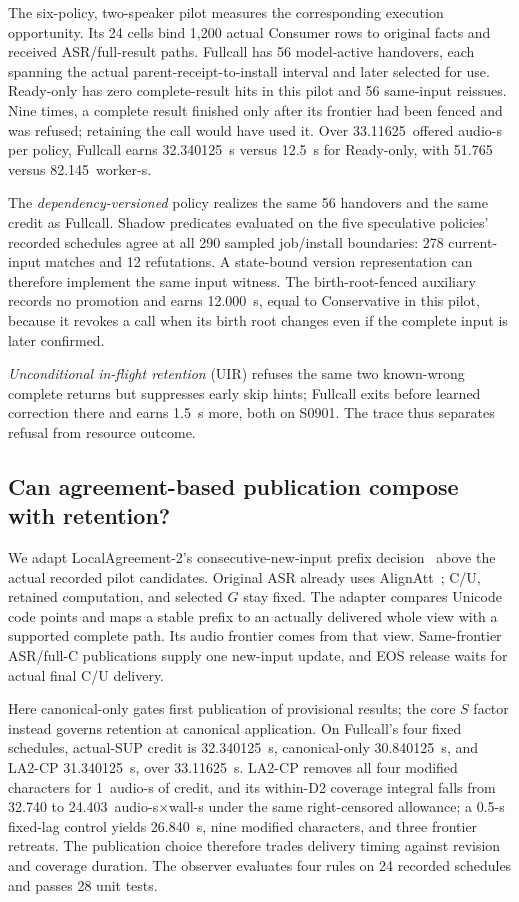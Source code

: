 The six-policy, two-speaker pilot measures the corresponding execution
opportunity. Its 24 cells bind 1,200 actual Consumer rows to original
facts and received ASR/full-result paths. Fullcall has 56 model-active
handovers, each spanning the actual parent-receipt-to-install interval
and later selected for use. Ready-only has zero complete-result hits in
this pilot and 56 same-input reissues. Nine times, a complete result
finished only after its frontier had been fenced and was refused;
retaining the call would have used it.
Over 33.11625~offered audio-s per policy, Fullcall earns 32.340125~s
versus 12.5~s for Ready-only, with 51.765 versus 82.145~worker-s.

The \emph{dependency-versioned} policy realizes the same 56 handovers
and the same credit as Fullcall. Shadow predicates evaluated on the
five speculative policies' recorded schedules agree at all 290 sampled
job/install boundaries: 278 current-input matches and 12 refutations.
A state-bound version representation can therefore implement the same
input witness. The birth-root-fenced auxiliary
records no promotion and earns 12.000~s, equal to Conservative in this
pilot, because it revokes a call when its birth root changes even if the
complete input is later confirmed.

\emph{Unconditional in-flight retention} (UIR) refuses the same two
known-wrong complete returns but suppresses early skip hints; Fullcall
exits before learned correction there and earns 1.5~s more, both on
S0901. The trace thus separates refusal from resource outcome.

\subsection{Can agreement-based publication compose with retention?}
We adapt LocalAgreement-2's consecutive-new-input prefix
decision~\cite{machacek2023whisperstreaming} above the actual recorded
pilot candidates. Original ASR already uses AlignAtt~\cite{papi2023alignatt};
C/U, retained computation, and selected $G$ stay fixed. The adapter
compares Unicode code points and maps a stable prefix to an actually
delivered whole view with a supported complete path. Its audio frontier
comes from that view. Same-frontier ASR/full-C publications supply one
new-input update, and EOS release waits for actual final C/U delivery.

Here canonical-only gates first publication of provisional results;
the core $S$ factor instead governs retention at canonical application.
On Fullcall's four fixed schedules, actual-SUP credit is 32.340125~s,
canonical-only 30.840125~s, and LA2-CP 31.340125~s, over 33.11625~s.
LA2-CP removes all four modified characters for 1~audio-s of credit,
and its within-D2 coverage integral falls from 32.740 to
24.403~audio-s$\times$wall-s under the same right-censored allowance; a
0.5-s fixed-lag control yields 26.840~s, nine modified characters, and
three frontier retreats. The publication choice therefore trades
delivery timing against revision and coverage duration. The observer evaluates four rules on 24 recorded schedules and passes 28
unit tests.

